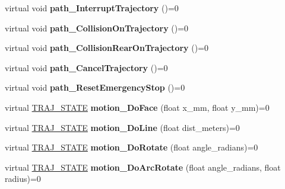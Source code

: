 \begin{DoxyCompactItemize}
virtual void {\bfseries path\+\_\+\+Interrupt\+Trajectory} ()=0
\item 
\mbox{\label{classAAsservDriver_a0faec2325a4b8e159bbccc28ddb4eba0}} 
virtual void {\bfseries path\+\_\+\+Collision\+On\+Trajectory} ()=0
\item 
\mbox{\label{classAAsservDriver_a46391c5413a97747093f0bbe366d16fc}} 
virtual void {\bfseries path\+\_\+\+Collision\+Rear\+On\+Trajectory} ()=0
\item 
\mbox{\label{classAAsservDriver_a5bc22cc735af0982a4c7a4d6fbe19c4f}} 
virtual void {\bfseries path\+\_\+\+Cancel\+Trajectory} ()=0
\item 
\mbox{\label{classAAsservDriver_a55e3b442898d83f302b9d9e0898317b6}} 
virtual void {\bfseries path\+\_\+\+Reset\+Emergency\+Stop} ()=0
\item 
\mbox{\label{classAAsservDriver_a1a20a75bd63b75ecaf511e824a8a796a}} 
virtual \hyperlink{path__manager_8h_adb3360abeb29758da93865c8afcb80eb}{T\+R\+A\+J\+\_\+\+S\+T\+A\+TE} {\bfseries motion\+\_\+\+Do\+Face} (float x\+\_\+mm, float y\+\_\+mm)=0
\item 
\mbox{\label{classAAsservDriver_a9a605eb37c55384962093a200a512bad}} 
virtual \hyperlink{path__manager_8h_adb3360abeb29758da93865c8afcb80eb}{T\+R\+A\+J\+\_\+\+S\+T\+A\+TE} {\bfseries motion\+\_\+\+Do\+Line} (float dist\+\_\+meters)=0
\item 
\mbox{\label{classAAsservDriver_a2211748fb68a1431096c17ba4f9d7c42}} 
virtual \hyperlink{path__manager_8h_adb3360abeb29758da93865c8afcb80eb}{T\+R\+A\+J\+\_\+\+S\+T\+A\+TE} {\bfseries motion\+\_\+\+Do\+Rotate} (float angle\+\_\+radians)=0
\item 
\mbox{\label{classAAsservDriver_a3c41681cce40f67e84af3ad973281913}} 
virtual \hyperlink{path__manager_8h_adb3360abeb29758da93865c8afcb80eb}{T\+R\+A\+J\+\_\+\+S\+T\+A\+TE} {\bfseries motion\+\_\+\+Do\+Arc\+Rotate} (float angle\+\_\+radians, float radius)=0
\item 
\mbox{\label{classAAsservDriver_ac62c5066c309e395a63a155f78053c9e}} 

\end{DoxyCompactItemize}

